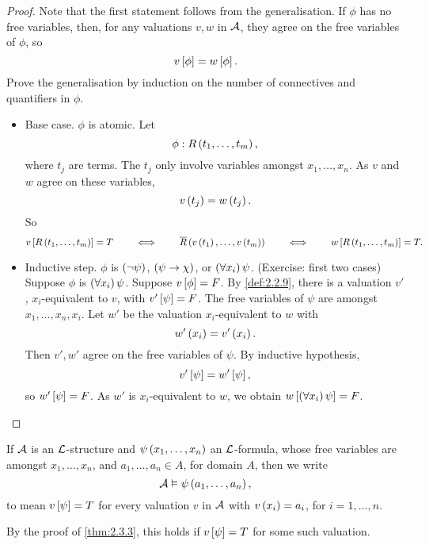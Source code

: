 \begin{proof}
Note that the first statement follows from the generalisation. If $ \phi $ has no free variables, then, for any valuations $ v, w $ in $ \AA $, they agree on the free variables of $ \phi $, so
$$ v\sb{\phi} = w\sb{\phi}. $$
Prove the generalisation by induction on the number of connectives and quantifiers in $ \phi $.
\begin{itemize}
\item Base case. $ \phi $ is atomic. Let
$$ \phi : R\rb{t_1, \dots, t_m}, $$
where $ t_j $ are terms. The $ t_j $ only involve variables amongst $ x_1, \dots, x_n $. As $ v $ and $ w $ agree on these variables,
$$ v\rb{t_j} = w\rb{t_j}. $$
So
$$ v\sb{R\rb{t_1, \dots, t_m}} = T \qquad \iff \qquad \overline{R}\rb{v\rb{t_1}, \dots, v\rb{t_m}} \qquad \iff \qquad w\sb{R\rb{t_1, \dots, t_m}} = T. $$
\item Inductive step. $ \phi $ is $ \notb{\psi} $, $ \impb{\psi}{\chi} $, or $ \fab{x_i}\psi $. (Exercise: first two cases) Suppose $ \phi $ is $ \fab{x_i}\psi $. Suppose $ v\sb{\phi} = F $. By \ref{def:2.2.9}, there is a valuation $ v' $, $ x_i $-equivalent to $ v $, with $ v'\sb{\psi} = F $. The free variables of $ \psi $ are amongst $ x_1, \dots, x_n, x_i $. Let $ w' $ be the valuation $ x_i $-equivalent to $ w $ with
$$ w'\rb{x_i} = v'\rb{x_i}. $$
Then $ v', w' $ agree on the free variables of $ \psi $. By inductive hypothesis,
$$ v'\sb{\psi} = w'\sb{\psi}, $$
so $ w'\sb{\psi} = F $. As $ w' $ is $ x_i $-equivalent to $ w $, we obtain $ w\sb{\fab{x_i}\psi} = F $.
\end{itemize}
\end{proof}


\begin{remark1}
If $ \AA $ is an $ \LL $-structure and $ \psi\rb{x_1, \dots, x_n} $ an $ \LL $-formula, whose free variables are amongst $ x_1, \dots, x_n $, and $ a_1, \dots, a_n \in A $, for domain $ A $, then we write
$$ \AA \vDash \psi\rb{a_1, \dots, a_n}, $$
to mean $ v\sb{\psi} = T $ for every valuation $ v $ in $ \AA $ with $ v\rb{x_i} = a_i $, for $ i = 1, \dots, n $.
\end{remark1}

\begin{remark2}
By the proof of \ref{thm:2.3.3}, this holds if $ v\sb{\psi} = T $ for some such valuation.
\end{remark2}

